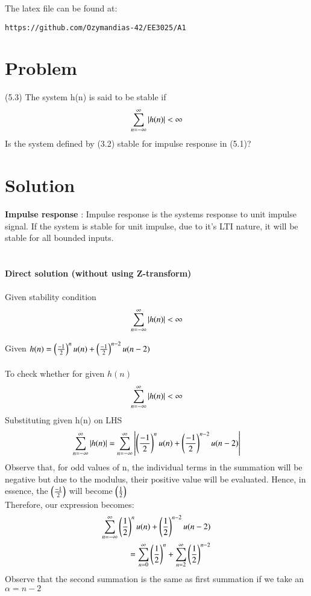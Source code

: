 \documentclass[journal,12pt,twocolumn]{IEEEtran}
\begin{document}
%
The latex file can be found at: 
%
\begin{lstlisting}
https://github.com/Ozymandias-42/EE3025/A1
\end{lstlisting}
\section{Problem}
(5.3) The system h(n) is said to be stable if \\
\begin{align}
\sum_{n=-\infty}^{\infty} \left\vert h(n)\right\vert < \infty \\
\end{align}
Is the system defined by (3.2) stable for impulse response in (5.1)?
\section{Solution}
\textbf{Impulse response} : Impulse response is the systems response to unit impulse signal.
If the system is stable for unit impulse, due to it's LTI nature, it will be stable for all bounded inputs.
\\
\\  
\\
\textbf{Direct solution (without using Z-transform)}
\\
\\
Given stability condition
\begin{align}
\sum_{n=-\infty}^{\infty} \left\vert h(n)\right\vert  < \infty\\
\end{align}

Given $h(n) = \left(\frac{-1}{2}\right)^{n}u(n) + \left(\frac{-1}{2}\right)^{n-2}u(n-2)$ 
\\
\\
To check whether for given $h(n)$
\begin{align}
\sum_{n=-\infty}^{\infty} \left\vert h(n)\right\vert < \infty
\end{align}
Substituting given h(n) on LHS
\begin{align}
\sum_{n=-\infty}^{\infty} \left\vert h(n)\right\vert = \sum_{n=-\infty}^{\infty} \left\vert\left(\frac{-1}{2}\right)^{n}u(n) + \left(\frac{-1}{2}\right)^{n-2}u(n-2)\right\vert\\
\end{align}
Observe that, for odd values of n, the individual terms in the summation will be negative but due to the modulus, their positive value will be evaluated. Hence, in essence, the $\left(\frac{-1}{2}\right)$ will become $\left(\frac{1}{2}\right)$\\
Therefore, our expression becomes:
\begin{align}
\sum_{n=-\infty}^{\infty} \left(\frac{1}{2}\right)^{n}u(n) + \left(\frac{1}{2}\right)^{n-2}u(n-2)\\
=\sum_{n=0}^{\infty}\left(\frac{1}{2}\right)^{n} + \sum_{n=2}^{\infty}\left(\frac{1}{2}\right)^{n-2}\\
\end{align}
Observe that the second summation is the same as first summation if we take an $\alpha=n-2$\\
\end{document}

